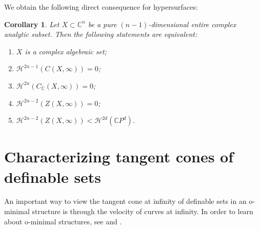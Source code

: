 \documentclass[a4paper,11pt]{amsart}
\newtheorem{corollary}[theorem]{Corollary}
\newcommand{\C}{\mathbb C}
\begin{document}
We obtain the following direct consequence for hypersurfaces:
\begin{corollary}
Let $X\subset\C^n$ be a pure $(n-1)$-dimensional entire complex analytic subset. Then the following statements are equivalent:
\begin{enumerate}
 \item $X$ is a complex algebraic set;
 \item $\mathcal{H}^{2n-1}(C(X,\infty))=0$;
 \item $\mathcal{H}^{2n}(C_{\mathbb{C}}(X,\infty))=0$;
 \item $\mathcal{H}^{2n-2}(Z(X,\infty))=0$;
 \item $\mathcal{H}^{2n-2}(Z(X,\infty))<\mathcal{H}^{2d}(\mathbb{C}P^{d})$.
\end{enumerate}
\end{corollary}



\appendix
\section{Characterizing tangent cones of definable sets}\label{sec:appendix}
An important way to view the tangent cone at infinity of definable sets in an o-minimal structure is through the velocity of curves at infinity. 
In order to learn about o-minimal structures, see \cite{Coste:1999} and \cite{Dries:1998}.
\end{document}
